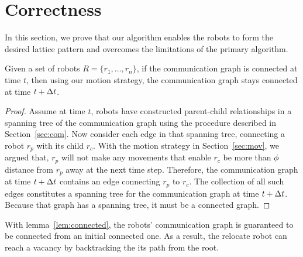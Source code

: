 \begin{figure}
\centering

\label{fig:nclb}
\end{figure}
\begin{figure}
\centering

\label{fig:safedist2}
\end{figure}
\begin{figure}
\centering

\label{fig:safedist}
\end{figure}


\section{Correctness}
\label{sec:proof}
In this section, we prove that our algorithm enables the robots to form the desired lattice pattern and overcomes the limitations of the primary algorithm.

\begin{lem}
\label{lem:connected}
    Given a set of robots $R =\{r_1, \ldots, r_n\}$, if the
    communication graph is connected at time $t$, then using our motion
    strategy, the communication graph stays connected at time $t+\Delta t$.
\end{lem}

\begin{proof}
    Assume at time $t$, robots have constructed parent-child relationships in a spanning tree of the communication graph using the procedure described in Section~\ref{sec:com}.
    Now consider each edge in that spanning tree, connecting a robot $r_p$ with its
    child $r_c$.
    With the motion strategy in Section~\ref{sec:mov}, we argued that,
    $r_p$ will not make any movements that enable $r_c$ be more than $\phi$
    distance from $r_p$ away at the next time step. 
    Therefore, the
    communication graph at time $t+\Delta t$ contains an edge connecting $r_p$ to
    $r_c$.
    The collection of all such edges constitutes a spanning tree for the
    communication graph at time $t+\Delta t$.  Because that graph has a spanning
    tree, it must be a connected graph.
\end{proof}

With lemma~\ref{lem:connected}, the robots'
communication graph is guaranteed to be connected from an initial connected one.
%
As a result, the relocate robot can reach a vacancy by backtracking the its path from the root. 

